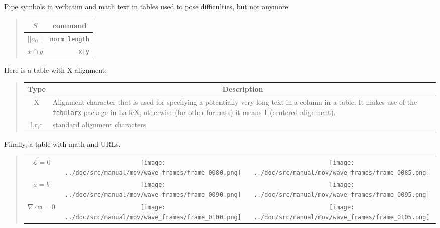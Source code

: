 \n\documentclass[%
oneside,                 %
final,                   %
10pt]{article}
\theoremstyle{definition}
\begin{document}
\begin{enumerate}
\noindent
Pipe symbols in verbatim and math text in tables used to pose difficulties,
but not
anymore:


\begin{quote}
\begin{tabular}{lr}
\hline
\multicolumn{1}{c}{ $S$ } & \multicolumn{1}{c}{ command } \\
\hline
$ ||a_0|| $ & \texttt{norm|length} \\
$x\cap y$   & \texttt{x|y}         \\
\hline
\end{tabular}
\end{quote}

\noindent
Here is a table with X alignment:


\begin{quote}
\begin{tabularx}{\linewidth}{cX}
\hline
\multicolumn{1}{c}{ Type } & \multicolumn{1}{c}{ Description } \\
\hline
X     & Alignment character that is used for specifying a potentially very long text in a column in a table. It makes use of the \texttt{tabularx} package in {\LaTeX}, otherwise (for other formats) it means \texttt{l} (centered alignment). \\
l,r,c & standard alignment characters                                                                                                                                                                                                       \\
\hline
\end{tabularx}
\end{quote}

\noindent
Finally, a table with math
and URLs.



\begin{quote}
\begin{tabular}{ccc}
\hline
 \\
\hline
$\mathcal{L}=0$         & \texttt{[image: ../doc/src/manual/mov/wave\_frames/frame\_0080.png]} & \texttt{[image: ../doc/src/manual/mov/wave\_frames/frame\_0085.png]} \\
$a=b$                   & \texttt{[image: ../doc/src/manual/mov/wave\_frames/frame\_0090.png]} & \texttt{[image: ../doc/src/manual/mov/wave\_frames/frame\_0095.png]} \\
$\nabla\cdot\bm{u} =0 $ & \texttt{[image: ../doc/src/manual/mov/wave\_frames/frame\_0100.png]} & \texttt{[image: ../doc/src/manual/mov/wave\_frames/frame\_0105.png]} \\
\hline
\end{tabular}
\end{quote}


\end{enumerate}
\end{document}
